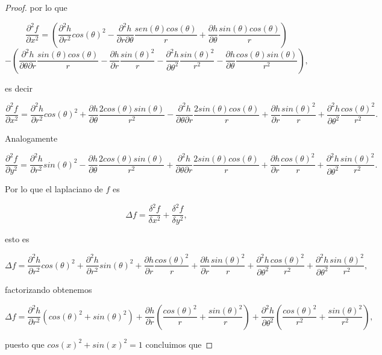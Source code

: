 \documentclass[letterpaper]{article}
\theoremstyle{definition}
\theoremstyle{lemathm}
\theoremstyle{lemathm}
\theoremstyle{lemademthm}
\newcommand{\pars}[1]{\left( #1 \right) }
\newcommand{\1}{\mathbbm{1}}
\begin{document}
\begin{enumerate}
\begin{proof}
			por lo que

			\[\frac{\partial^2 f}{\partial x^2} = \pars{\frac{\partial^2 h}{\partial r^2}cos(\theta)^2 - \frac{\partial^2 h}{\partial r\partial \theta}\frac{sen(\theta)cos(\theta)}{r} + \frac{\partial h}{\partial \theta} \frac{sin(\theta)cos(\theta)}{r}}\]\[ - \pars{\frac{\partial^2 h}{\partial \theta \partial r}\frac{sin(\theta)cos(\theta)}{r} - \frac{\partial h}{\partial r}\frac{sin(\theta)^2}{r} - \frac{\partial^2 h}{\partial \theta^2}\frac{sin(\theta)^2}{r^2} - \frac{\partial h}{\partial \theta}\frac{cos(\theta)sin(\theta)}{r^2}},\]

			es decir

			\[\frac{\partial^2 f}{\partial x^2} = \frac{\partial^2 h}{\partial r^2}cos(\theta)^2 + \frac{\partial h}{\partial \theta}\frac{2cos(\theta)sin(\theta)}{r^2} - \frac{\partial^2 h}{\partial \theta \partial r}\frac{2sin(\theta)cos(\theta)}{r} + \frac{\partial h}{\partial r}\frac{sin(\theta)^2}{r} + \frac{\partial^2 h}{\partial \theta^2} \frac{cos(\theta)^2}{r^2}.\]

			Analogamente

			\[\frac{\partial^2 f}{\partial y^2} = \frac{\partial^2 h}{\partial r^2}sin(\theta)^2 - \frac{\partial h}{\partial \theta}\frac{2cos(\theta)sin(\theta)}{r^2} + \frac{\partial^2 h}{\partial \theta \partial r}\frac{2sin(\theta)cos(\theta)}{r} + \frac{\partial h}{\partial r}\frac{cos(\theta)^2}{r} + \frac{\partial^2 h}{\partial \theta^2} \frac{sin(\theta)^2}{r^2}.\]

			Por lo que el laplaciano de $f$ es

			\[\Delta f = \frac{\delta^2 f}{\delta x^2} + \frac{\delta^2 f}{\delta y^2},\]

			esto es

			\[\Delta f = \frac{\partial^2 h}{\partial r^2}cos(\theta)^2 + \frac{\partial^2 h}{\partial r^2}sin(\theta)^2 + \frac{\partial h}{\partial r}\frac{cos(\theta)^2}{r} + \frac{\partial h}{\partial r}\frac{sin(\theta)^2}{r} + \frac{\partial^2 h}{\partial \theta^2}\frac{cos(\theta)^2}{r^2} + \frac{\partial^2 h}{\partial \theta^2}\frac{sin(\theta)^2}{r^2},\]

			factorizando obtenemos

			\[\Delta f = \frac{\partial^2 h}{\partial r^2}\pars{cos(\theta)^2 + sin(\theta)^2} + \frac{\partial h}{\partial r}\pars{\frac{cos(\theta)^2}{r} + \frac{sin(\theta)^2}{r}} + \frac{\partial^2 h}{\partial \theta^2}\pars{\frac{cos(\theta)^2}{r^2} + \frac{sin(\theta)^2}{r^2}},\]

			puesto que $cos(x)^2 + sin(x)^2 = 1$ concluimos que


\end{proof}
\end{enumerate}
\end{document}
